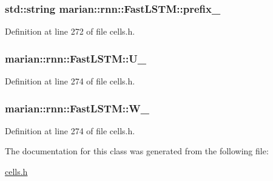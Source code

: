 \subsubsection[{\texorpdfstring{prefix\+\_\+}{prefix_}}]{\setlength{\rightskip}{0pt plus 5cm}std\+::string marian\+::rnn\+::\+Fast\+L\+S\+T\+M\+::prefix\+\_\+\hspace{0.3cm}{\ttfamily [protected]}}\hypertarget{classmarian_1_1rnn_1_1FastLSTM_ae6f3dc1b6b63ffb7ae68eafdf98ca5de}{}\label{classmarian_1_1rnn_1_1FastLSTM_ae6f3dc1b6b63ffb7ae68eafdf98ca5de}


Definition at line 272 of file cells.\+h.

\subsubsection[{\texorpdfstring{U\+\_\+}{U_}}]{ marian\+::rnn\+::\+Fast\+L\+S\+T\+M\+::\+U\+\_\+\hspace{0.3cm}{\ttfamily [protected]}}\hypertarget{classmarian_1_1rnn_1_1FastLSTM_a94423205eb1b2cedf8a1c9e48f5b9c0e}{}\label{classmarian_1_1rnn_1_1FastLSTM_a94423205eb1b2cedf8a1c9e48f5b9c0e}


Definition at line 274 of file cells.\+h.

\subsubsection[{\texorpdfstring{W\+\_\+}{W_}}]{ marian\+::rnn\+::\+Fast\+L\+S\+T\+M\+::\+W\+\_\+\hspace{0.3cm}{\ttfamily [protected]}}\hypertarget{classmarian_1_1rnn_1_1FastLSTM_ad0953564d51fae532551b75bc51cfe0d}{}\label{classmarian_1_1rnn_1_1FastLSTM_ad0953564d51fae532551b75bc51cfe0d}


Definition at line 274 of file cells.\+h.



The documentation for this class was generated from the following file\+:\begin{DoxyCompactItemize}
\item 
\hyperlink{cells_8h}{cells.\+h}\end{DoxyCompactItemize}
